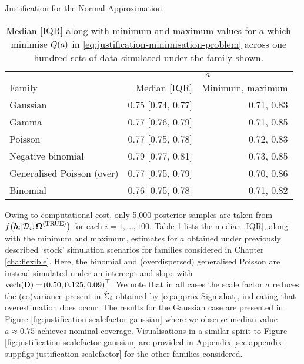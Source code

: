 \begin{chapter}{\label{cha:justification}Justification for the Normal Approximation}
  \begin{table}[ht]
      \centering
      \captionsetup{font=scriptsize}
      \begin{tabular}{l|rr}
        & \multicolumn{2}{c}{$a$}\\
        Family &  Median [IQR] & Minimum, maximum\\
        \hline
        Gaussian  & 0.75 [0.74, 0.77] & 0.71, 0.83\\
        Gamma & 0.77 [0.76, 0.79] & 0.71, 0.85\\
        Poisson & 0.77 [0.75, 0.78] & 0.72, 0.83\\
        Negative binomial & 0.79 [0.77, 0.81] & 0.73, 0.85\\
        Generalised Poisson (over) & 0.77 [0.75, 0.79] & 0.70, 0.86\\
        Binomial & 0.76 [0.75, 0.78] & 0.71, 0.82\\
        \hline
      \end{tabular}
      \caption{Median [IQR] along with minimum and maximum values for $a$ which minimise $Q\!\left( a\right)$ in \eqref{eq:justification-minimisation-problem} across one hundred sets of data simulated under the family shown.}
      \label{tab:justification-sfs}
  \end{table}

  Owing to computational cost, only 5,000 posterior samples are taken from $f\big(\bm{b}_i|\mathcal{D}_i;\bm{\mathrm{\Omega}}^{(\mathrm{TRUE})}\big)$ for each $i=1,\dots,100$. Table \ref{tab:justification-sfs} lists the median [IQR], along with the minimum and maximum, estimates for $a$ obtained under previously described `stock' simulation scenarios for families considered in Chapter \ref{cha:flexible}. Here, the binomial and (overdispersed) generalised Poisson are instead simulated under an intercept-and-slope with $\text{vech}\!\left(\mathrm{D}\right)=\!\left(0.50,0.125,0.09\right)^\top$. We note that in all cases the scale factor $a$ reduces the (co)variance present in $\hat{\Sigma}_i$ obtained by \eqref{eq:approx-Sigmahat}, indicating that overestimation does occur. The results for the Gaussian case are presented in Figure \ref{fig:justification-scalefactor-gaussian} where we observe median value $a\approx0.75$ achieves nominal coverage. Visualisations in a similar spirit to Figure \ref{fig:justification-scalefactor-gaussian} are provided in Appendix \ref{sec:appendix-suppfigs-justification-scalefactor} for the other families considered.
  

\end{chapter}
